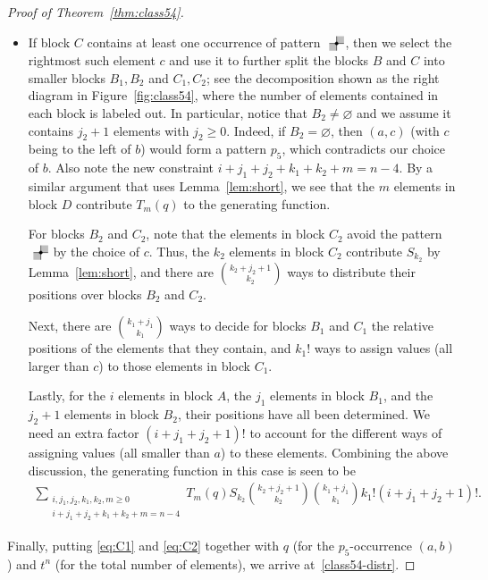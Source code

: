 \documentclass[12pt]{article}
\newcommand{\pattern}[4]{										
	\raisebox{0.6ex}{
		\begin{tikzpicture}[scale=0.35, baseline=(current bounding box.center), #1]
		\foreach \x/\y in {#4}		\fill[gray!50] (\x,\y) rectangle +(1,1);

		\draw (0.01,0.01) grid (#2+0.99,#2+0.99);
		\foreach \x/\y in {#3}		\filldraw (\x,\y) circle (6pt);
		\end{tikzpicture}}
}
\begin{document}
\begin{proof}[Proof of Theorem~\ref{thm:class54}]
\begin{itemize}
\item If block $C$ contains at least one occurrence of pattern $\pattern{scale=0.6}{1}{1/1}{0/0,1/1}$, then we select the rightmost such element $c$ and use it to further split the blocks $B$ and $C$ into smaller blocks $B_1,B_2$ and $C_1,C_2$; see the decomposition shown as the right diagram in Figure~\ref{fig:class54}, where the number of elements contained in each block is labeled out. In particular, notice that $B_2\neq \varnothing$ and we assume it contains $j_2+1$ elements with $j_2\ge 0$. Indeed, if $B_2=\varnothing$, then $(a,c)$ (with $c$ being to the left of $b$) would form a pattern $p_5$, which contradicts our choice of $b$. Also note the new constraint $i+j_1+j_2+k_1+k_2+m=n-4$. By a similar argument that uses Lemma~\ref{lem:short}, we see that the $m$ elements in block $D$ contribute $T_m(q)$ to the generating function.

For blocks $B_2$ and $C_2$, note that the elements in block $C_2$ avoid the pattern $\pattern{scale=0.6}{1}{1/1}{0/0,1/1}$ by the choice of $c$. Thus, the $k_2$ elements in block $C_2$ contribute $S_{k_2}$ by Lemma~\ref{lem:short}, and there are $\binom{k_2+j_2+1}{k_2}$ ways to distribute their positions over blocks $B_2$ and $C_2$. 

Next, there are $\binom{k_1+j_1}{k_1}$ ways to decide for blocks $B_1$ and $C_1$ the relative positions of the elements that they contain, and $k_1!$ ways to assign values (all larger than $c$) to those elements in block $C_1$.

Lastly, for the $i$ elements in block $A$, the $j_1$ elements in block $B_1$, and the $j_2+1$ elements in block $B_2$, their positions have all been determined. We need an extra factor $(i+j_1+j_2+1)!$ to account for the different ways of assigning values (all smaller than $a$) to these elements. Combining the above discussion, the generating function in this case is seen to be
\begin{align}\label{eq:C2}
\sum_{\substack{i, j_1, j_2, k_1, k_2, m\geq 0\\i+j_1+j_2+k_1+k_2+m=n-4}}T_m(q) S_{k_2} \binom{k_2+j_2+1}{k_2}\binom{k_1+j_1}{k_1}k_1!(i+j_1+j_2+1)!.
\end{align}
\end{itemize}
Finally, putting \eqref{eq:C1} and \eqref{eq:C2} together with $q$ (for the $p_5$-occurrence $(a,b)$) and $t^n$ (for the total number of elements), we arrive at~\eqref{class54-distr}.
\end{proof}
\end{document}
